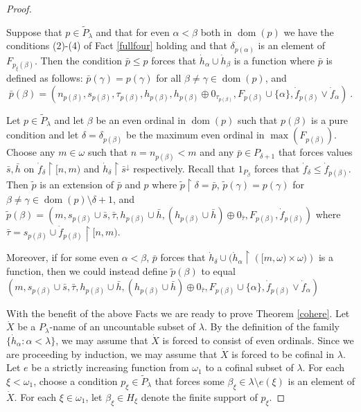 \documentclass[10pt,a4paper]{amsart}
\def\dom{\operatorname{dom}}
\begin{document}
\begin{proof}
\begin{Fact} Suppose that $p\in \tilde P_\lambda$ and that for
even $\alpha < \beta$ both in $\dom(p)$ we have\label{just3}
the conditions (2)-(4) of Fact \ref{fullfour} holding
and that $\delta_{p(\alpha)}$ is an element of $F_{p_\xi(\beta)}$.
Then the  condition $\bar p \leq p$ forces that $
\dot h_\alpha\cup \dot h_\beta$ is a function where
$\bar p$ is defined as follows: 
$\bar p(\gamma)=p(\gamma)$ for all $\beta\neq \gamma \in \dom(p)$,
and 
$$\bar p(\beta) = (n_{p(\beta)}, s_{p(\beta)},
 \tau_{p(\beta)}, h_{p(\beta)}, h_{p(\beta)}\oplus 0_{\tau_{p(\beta)}} , 
   F_{p(\beta)}\cup \{ \alpha\}, \dot f_{p(\beta)} \vee \dot f_\alpha)~.$$
\end{Fact}

\begin{Fact} Let $p\in \tilde P_\lambda$ and\label{addmu}
let $  \beta$ be an even ordinal
in $\dom(p)$ such that  $p(\beta)$ is a   pure condition
and let $\delta = \delta_{p(\beta)}$ be the maximum even ordinal 
in $  \max(F_{p(\beta)})$.  Choose
any $m\in\omega$ such that $n = n_{p(\beta)}< m$ and any
$\bar p\in P_{\delta+1}$ that forces   values $\bar s, \bar h$
on $\dot f_\delta\restriction [n,m)$ and $\dot h_\delta\restriction 
\bar s^{\downarrow}$ respectively.
Recall that $1_{P_\beta}$ forces that $\dot f_\delta\leq \dot f_{p(\beta)}$.
Then $\tilde p$ is an extension
of $\bar p$ and $p$ where $\tilde p\restriction \delta = \bar p$,
 $\tilde p(\gamma) = p(\gamma)$ for $\beta\neq \gamma \in \dom(p) 
 \setminus \delta{+}1$,
 and $\tilde p(\beta) =
 (m, s_{p(\beta)}\cup \bar s, \bar \tau , h_{p(\beta)}\cup \bar h,
 ( h_{p(\beta)}\cup \bar h)\oplus 0_{\bar\tau}, F_{p(\beta)}, \dot f_{p(\beta)})$
 where $\bar\tau = s_{p(\beta)}\cup \dot f_{p(\beta)}\restriction [n,m)$.
 \medskip

 Moreover, if for some even $\alpha <\beta$, $\bar p$ forces
 that $\dot h_\delta\cup (\dot h_\alpha \restriction \left([m,\omega)\times \omega )\right)$
 is a function, then we could instead define $\tilde p(\beta)$
 to equal $
 (m, s_{p(\beta)}\cup \bar s, \bar \tau , h_{p(\beta)}\cup \bar h,
 ( h_{p(\beta)}\cup \bar h)\oplus 0_{\bar\tau}, F_{p(\beta)}\cup\{\alpha\}, \dot f_{p(\beta)}
\vee \dot f_\alpha )$
\end{Fact}

 
\bigskip

With the benefit of the above Facts we are ready to prove Theorem \ref{cohere}.
Let $\dot X$
be a $P_\lambda$-name of an uncountable subset of $\lambda$.
By the definition of the family $\{ \dot h_\alpha : \alpha<\lambda\}$,
 we may assume that $\dot X$ is forced to consist of even ordinals.
Since we are proceeding by induction, we may assume
that $\dot X$ is forced to be cofinal in $\lambda$.
Let $e$ be a strictly increasing function from $\omega_1$
to a cofinal subset of $\lambda$.
 For each $\xi < \omega_1$, choose a condition $p_\xi\in \tilde P_\lambda$
 that forces some $ \beta_\xi \in \lambda\setminus e(\xi) $ is an element
 of $\dot X$. For each $\xi\in\omega_1$, let $\beta_\xi\in H_\xi$ denote the finite
 support of $p_\xi$. 


\end{proof}
\end{document}
